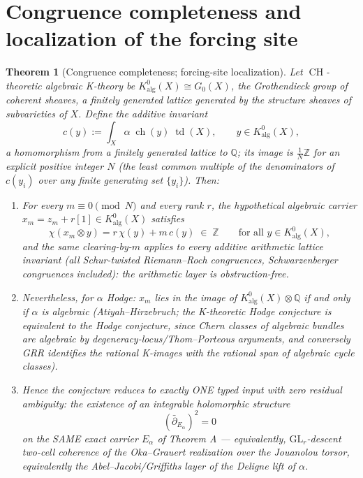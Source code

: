 \documentclass[11pt]{article}
\newtheorem{theorem}{Theorem}
\newcommand{\ch}{\operatorname{ch}}
\newcommand{\td}{\operatorname{td}}
\newcommand{\ddbar}{\bar\partial}
\begin{document}
\section{Congruence completeness and localization of the forcing site}
\begin{theorem}[Congruence completeness; forcing-site localization]
\label{thm:B2}
Let $\operatorname{CH}$-theoretic algebraic K-theory be
$K^0_{\mathrm{alg}}(X)\cong G_0(X)$, the Grothendieck group of coherent
sheaves, a finitely generated lattice generated by the structure
sheaves of subvarieties of $X$. Define the additive invariant
\[
  c(y):=\int_X \alpha\;\ch(y)\;\td(X),
  \qquad y\in K^0_{\mathrm{alg}}(X),
\]
a homomorphism from a finitely generated lattice to $\mathbb Q$; its
image is $\frac1N\mathbb Z$ for an explicit positive integer $N$
(the least common multiple of the denominators of
$c(y_i)$ over any finite generating set $\{y_i\}$).
Then:
\begin{enumerate}
\item[\textup{(i)}] For every $m\equiv 0\pmod N$ and every rank $r$,
the hypothetical algebraic carrier
$x_m=z_m+r[1]\in K^0_{\mathrm{alg}}(X)$ satisfies
\[
  \chi(x_m\otimes y)=r\,\chi(y)+m\,c(y)\;\in\;\mathbb Z
  \qquad\text{for all }y\in K^0_{\mathrm{alg}}(X),
\]
and the same clearing-by-$m$ applies to every additive arithmetic
lattice invariant (all Schur-twisted Riemann--Roch congruences,
Schwarzenberger congruences included): the arithmetic layer is
obstruction-free.
\item[\textup{(ii)}] Nevertheless, for $\alpha$ Hodge:
$x_m$ lies in the image of
$K^0_{\mathrm{alg}}(X)\otimes\mathbb Q$ if and only if $\alpha$ is
algebraic (Atiyah--Hirzebruch; the K-theoretic Hodge conjecture is
equivalent to the Hodge conjecture, since Chern classes of algebraic
bundles are algebraic by degeneracy-locus/Thom--Porteous arguments,
and conversely GRR identifies the rational K-images with the rational
span of algebraic cycle classes).
\item[\textup{(iii)}] Hence the conjecture reduces to exactly ONE typed
input with zero residual ambiguity: the existence of an integrable
holomorphic structure
\[
  \boxed{\;(\ddbar_{E_\alpha})^2=0\;}
\]
on the SAME exact carrier $E_\alpha$ of Theorem A ---
equivalently, $\mathrm{GL}_r$-descent two-cell coherence of the
Oka--Grauert realization over the Jouanolou torsor, equivalently the
Abel--Jacobi/Griffiths layer of the Deligne lift of $\alpha$.
\end{enumerate}
\end{theorem}
\end{document}
